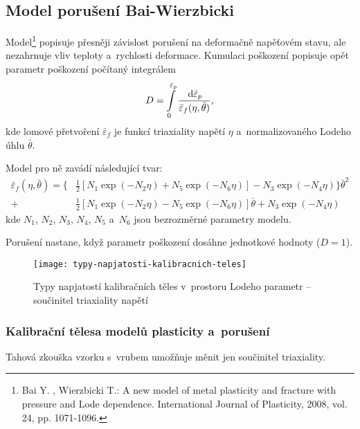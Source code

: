
\subsection{Model porušení Bai-Wierzbicki}\label{sec:bai-wierzbicki}
Model\footnote{Bai Y. , Wierzbicki T.:  A new model of metal plasticity and fracture with pressure and Lode dependence. International Journal of Plasticity, 2008, vol. 24, pp. 1071-1096.} popisuje přesněji závislost porušení na deformačně napěťovém stavu, ale nezahrnuje vliv teploty a~rychlosti deformace. Kumulaci poškození popisuje opět parametr poškození počítaný integrálem
\begin{equation}
	D = \int\limits_0^{\bar{\varepsilon}_p} \frac{\,\mathrm{d} \bar{\varepsilon}_p}{\bar{\varepsilon}_f(\eta, \bar{\theta})},
\end{equation}
kde lomové přetvoření $\bar{\varepsilon}_f$ je funkcí triaxiality napětí $\eta$ a~normalizovaného Lodeho úhlu $\bar{\theta}$.

Model pro ně zavádí následující tvar:
\begin{equation}\begin{split}
	\bar{\varepsilon}_f(\eta, \bar{\theta})
	= \big\{&\tfrac{1}{2} \left[ N_1 \exp(-N_2 \eta) + N_5 \exp(-N_6 \eta) \right] - N_3 \exp(-N_4 \eta) \big\} \bar{\theta}^2\\
	+ &\tfrac{1}{2} \left[ N_1 \exp(-N_2 \eta) - N_5 \exp(-N_6 \eta) \right] \bar{\theta} + N_3 \exp(-N_4 \eta)
\end{split}\end{equation}
kde $N_1$, $N_2$, $N_3$, $N_4$, $N_5$ a~$N_6$ jsou bezrozměrné parametry modelu.

Porušení nastane, když parametr poškození dosáhne jednotkové hodnoty ($D=1$).

\begin{figure}[H]
	\label{fig:typy-napjatosti-kalibracnich-teles}
	\centering
	\texttt{[image: typy-napjatosti-kalibracnich-teles]}
	\caption[Typy napjatostí kalibračních těles]{Typy napjatostí kalibračních těles v~prostoru Lodeho parametr -- součinitel triaxiality napětí}
\end{figure}

\subsubsection{Kalibrační tělesa modelů plasticity a~porušení}
Tahová zkouška vzorku s~vrubem umožňuje měnit jen součinitel triaxiality.

